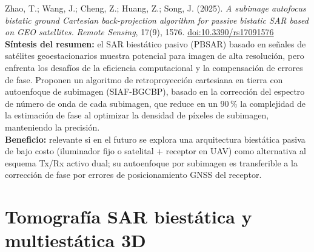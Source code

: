 \documentclass[11pt,a4paper]{report}
\begin{document}
\begin{enumerate}[label=\textbf{[B\arabic*]}, leftmargin=2.2cm, itemsep=10pt]
\item Zhao, T.; Wang, J.; Cheng, Z.; Huang, Z.; Song, J. (2025). \textit{A
subimage autofocus bistatic ground Cartesian back-projection algorithm for
passive bistatic SAR based on GEO satellites.} \emph{Remote Sensing}, 17(9),
1576. \href{https://doi.org/10.3390/rs17091576}{doi:10.3390/rs17091576}
\cite{zhao2025}\\
\textbf{Síntesis del resumen:} el SAR biestático pasivo (PBSAR) basado en
señales de satélites geoestacionarios muestra potencial para imagen de alta
resolución, pero enfrenta los desafíos de la eficiencia computacional y la
compensación de errores de fase. Proponen un algoritmo de retroproyección
cartesiana en tierra con autoenfoque de subimagen (SIAF-BGCBP), basado en la
corrección del espectro de número de onda de cada subimagen, que reduce en
un 90\,\% la complejidad de la estimación de fase al optimizar la densidad
de píxeles de subimagen, manteniendo la precisión.\\
\textbf{Beneficio:} relevante si en el futuro se explora una arquitectura
biestática pasiva de bajo costo (iluminador fijo o satelital + receptor en
UAV) como alternativa al esquema Tx/Rx activo dual; su autoenfoque por
subimagen es transferible a la corrección de fase por errores de
posicionamiento GNSS del receptor.

\end{enumerate}

\section{Tomografía SAR biestática y multiestática 3D}
\label{sec:tomografia}
\end{document}
